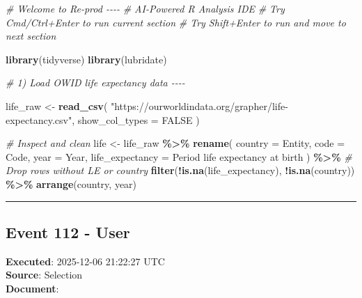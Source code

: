 \documentclass[
  11pt,
]{article}
\newenvironment{Shaded}{\begin{snugshade}}{\end{snugshade}}
\newcommand{\AttributeTok}[1]{\textcolor[rgb]{0.13,0.29,0.53}{#1}}
\newcommand{\CommentTok}[1]{\textcolor[rgb]{0.56,0.35,0.01}{\textit{#1}}}
\newcommand{\ConstantTok}[1]{\textcolor[rgb]{0.56,0.35,0.01}{#1}}
\newcommand{\FunctionTok}[1]{\textcolor[rgb]{0.13,0.29,0.53}{\textbf{#1}}}
\newcommand{\NormalTok}[1]{#1}
\newcommand{\OtherTok}[1]{\textcolor[rgb]{0.56,0.35,0.01}{#1}}
\newcommand{\SpecialCharTok}[1]{\textcolor[rgb]{0.81,0.36,0.00}{\textbf{#1}}}
\newcommand{\StringTok}[1]{\textcolor[rgb]{0.31,0.60,0.02}{#1}}
\begin{document}
\begin{Shaded}
\begin{Highlighting}[]
\CommentTok{\# Welcome to Re{-}prod {-}{-}{-}{-}}
\CommentTok{\# AI{-}Powered R Analysis IDE}
\CommentTok{\# Try Cmd/Ctrl+Enter to run current section}
\CommentTok{\# Try Shift+Enter to run and move to next section}

\FunctionTok{library}\NormalTok{(tidyverse)}
\FunctionTok{library}\NormalTok{(lubridate)}

\CommentTok{\# 1) Load OWID life expectancy data {-}{-}{-}{-}}

\NormalTok{life\_raw }\OtherTok{\textless{}{-}} \FunctionTok{read\_csv}\NormalTok{(}
  \StringTok{"https://ourworldindata.org/grapher/life{-}expectancy.csv"}\NormalTok{,}
  \AttributeTok{show\_col\_types =} \ConstantTok{FALSE}
\NormalTok{)}

\CommentTok{\# Inspect and clean}
\NormalTok{life }\OtherTok{\textless{}{-}}\NormalTok{ life\_raw }\SpecialCharTok{\%\textgreater{}\%}
  \FunctionTok{rename}\NormalTok{(}
    \AttributeTok{country =}\NormalTok{ Entity,}
    \AttributeTok{code =}\NormalTok{ Code,}
    \AttributeTok{year =}\NormalTok{ Year,}
    \AttributeTok{life\_expectancy =} \StringTok{\textasciigrave{}}\AttributeTok{Period life expectancy at birth}\StringTok{\textasciigrave{}}
\NormalTok{  ) }\SpecialCharTok{\%\textgreater{}\%}
  \CommentTok{\# Drop rows without LE or country}
  \FunctionTok{filter}\NormalTok{(}\SpecialCharTok{!}\FunctionTok{is.na}\NormalTok{(life\_expectancy), }\SpecialCharTok{!}\FunctionTok{is.na}\NormalTok{(country)) }\SpecialCharTok{\%\textgreater{}\%}
  \FunctionTok{arrange}\NormalTok{(country, year)}
\end{Highlighting}
\end{Shaded}

\begin{center}\rule{0.5\linewidth}{0.5pt}\end{center}

\subsection{Event 112 - User}\label{event-112---user}

\textbf{Executed}: 2025-12-06 21:22:27 UTC\\
\textbf{Source}: Selection\\
\textbf{Document}:
\end{document}
